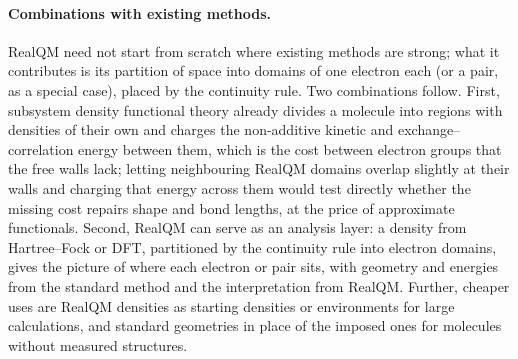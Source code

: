\documentclass[11pt]{article}
\begin{document}
\paragraph{Combinations with existing methods.} RealQM need not start from scratch where existing methods are strong;
what it contributes is its partition of space into domains of one electron each (or a pair, as a special case), placed by the continuity
rule. Two combinations follow. First, subsystem density functional theory already divides a molecule into regions
with densities of their own and charges the non-additive kinetic and exchange--correlation energy between them, which
is the cost between electron groups that the free walls lack; letting neighbouring RealQM domains overlap slightly
at their walls and charging that energy across them would test directly whether the missing cost repairs shape and
bond lengths, at the price of approximate functionals. Second, RealQM can serve as an analysis layer: a
density from Hartree--Fock or DFT, partitioned by the continuity rule into electron domains, gives the picture of
where each electron or pair sits, with geometry and energies from the standard method and the interpretation from
RealQM. Further, cheaper uses are RealQM densities as starting densities or environments for large calculations,
and standard geometries in place of the imposed ones for molecules without measured structures.
\end{document}
